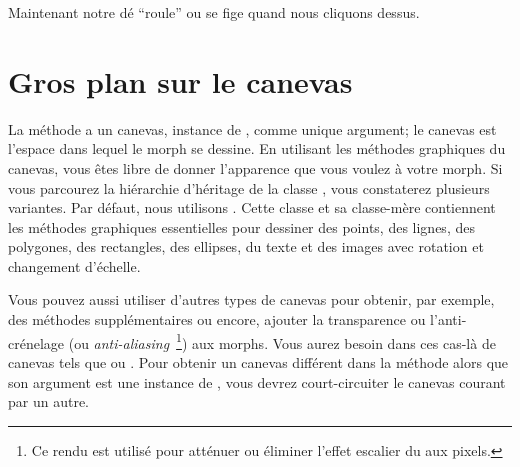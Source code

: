 \documentclass[a4paper,10pt,twoside]{book}
\begin{document}
Maintenant notre d\'e ``roule'' ou se fige quand nous cliquons dessus.



\section{Gros plan sur le canevas}

La m\'ethode  a un canevas, instance de
, comme unique argument;
le canevas est l'espace dans lequel le morph se dessine.
En utilisant les m\'ethodes graphiques du canevas, vous \^etes libre
de donner l'apparence que vous voulez \`a votre morph.
Si vous parcourez la hi\'erarchie d'h\'eritage de la classe
, vous constaterez plusieurs variantes. Par d\'efaut, nous
utilisons . Cette classe et sa classe-m\`ere
 contiennent les m\'ethodes graphiques essentielles pour
dessiner des points, des lignes, des polygones, des rectangles, des
ellipses, du texte et des images avec rotation et changement d'\'echelle. 

Vous pouvez aussi utiliser d'autres types de canevas pour obtenir, par
exemple, des m\'ethodes suppl\'ementaires ou encore, ajouter la
transparence ou l'anti-cr\'enelage (ou
\emph{anti-aliasing}~\footnote{Ce rendu est utilis\'e pour att\'enuer
  ou \'eliminer l'effet escalier du aux pixels.}) aux morphs.  
Vous aurez besoin dans ces cas-l\`a de canevas tels que
 ou .
Pour obtenir un canevas diff\'erent dans la m\'ethode 
alors que son argument est une instance de , vous devrez
court-circuiter le canevas courant par un autre. 
\end{document}
